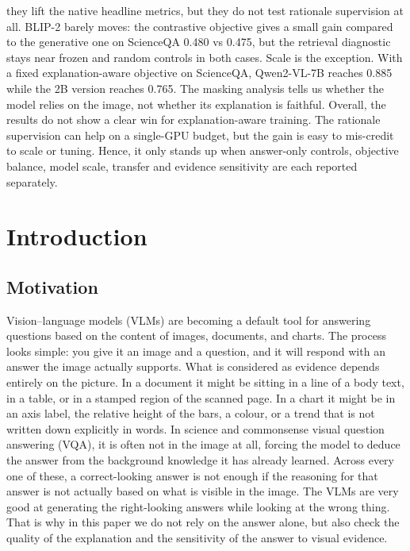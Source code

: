 \documentclass[12pt,bibliography=totoc,listof=totoc,BCOR=5mm,DIV=12,oneside,open=any]{scrbook}
\begin{document}
they lift the native headline metrics, but they do not test rationale supervision at all.
BLIP-2 barely moves: the contrastive objective gives a small gain compared to the generative one on ScienceQA 0.480 vs 0.475,
but the retrieval diagnostic stays near frozen and random controls in both cases.
Scale is the exception. With a fixed explanation-aware objective on ScienceQA, Qwen2-VL-7B reaches 0.885 while the 2B version reaches 0.765.
The masking analysis tells us whether the model relies on the image, not whether its explanation is faithful.
Overall, the results do not show a clear win for explanation-aware training.
The rationale supervision can help on a single-GPU budget, but the gain is easy to mis-credit to scale or tuning.
Hence, it only stands up when answer-only controls, objective balance, model scale, transfer and evidence sensitivity are each reported separately.

    \clearpage

    \tableofcontents
    \clearpage

    \listoffigures
    \clearpage

    \listoftables
    \clearpage


\mainmatter %

\chapter{Introduction}
\section{Motivation}
Vision--language models (VLMs) are becoming a default tool for answering questions based on the content of images, documents, and charts.
The process looks simple: you give it an image and a question, and it will respond with an answer the image actually supports.
What is considered as evidence depends entirely on the picture. 
In a document it might be sitting in a line of a body text, in a table, or in a stamped region of the scanned page.
In a chart it might be in an axis label, the relative height of the bars, a colour, or a trend that is not written down explicitly in words.
In science and commonsense visual question answering (VQA), it is often not in the image at all, forcing the model to deduce the answer from the background knowledge it has already learned.
Across every one of these, a correct-looking answer is not enough if the reasoning for that answer is not actually based on what is visible in the image.
The VLMs are very good at generating the right-looking answers while looking at the wrong thing.
That is why in this paper we do not rely on the answer alone, but also check the quality of the explanation and the sensitivity of the answer to visual evidence.
\end{document}
